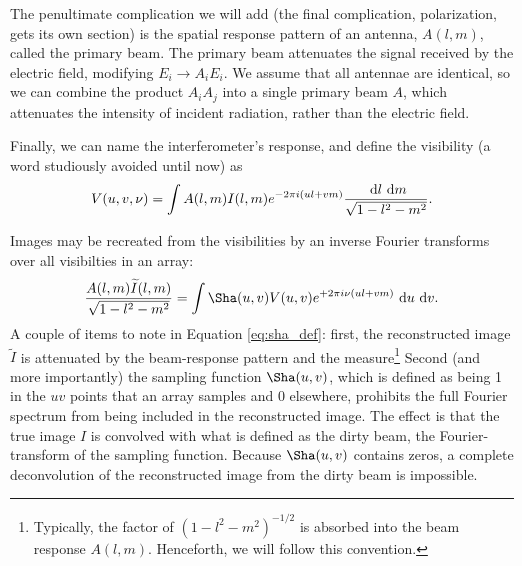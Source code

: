 The penultimate complication we will add (the final complication, polarization, gets its own
section) is the spatial response pattern of an antenna, $A(l,m)$, called the primary beam. The
primary beam attenuates the signal received by the electric field, modifying $E_i \to A_iE_i$.
We assume that all antennae are identical, so we can combine the product $A_iA_j$ into a single
primary beam $A$, which attenuates the intensity of incident radiation, rather than the electric
field.

Finally, we can name the interferometer's response, and define the visibility
(a word studiously
avoided until now) as
\begin{equation}
  V(u,v,\nu) = \int A(l,m)I(l,m)e^{-2\pi i (ul + vm)}\frac{\ \mathrm{d}l\ \mathrm{d}m}{\sqrt{1-l^2-m^2}}.
  \label{eq:visdef}
\end{equation}

Images may be recreated from the visibilities by an inverse Fourier transforms over all visibilties
in an array:
\begin{equation}
  \frac{A(l,m)\widetilde{I}(l,m)}{\sqrt{1-l^2-m^2}} 
  = \int \Sha(u,v)V(u,v)e^{+2\pi i\nu(ul+vm)}\D{u}\D{v}.
  \label{eq:sha_def}
\end{equation}
A couple of items to note in Equation \ref{eq:sha_def}: first, the reconstructed image
$\widetilde{I}$ is attenuated by the beam-response pattern and the measure\footnote{Typically, 
the factor of $(1-l^2-m^2)^{-1/2}$ is absorbed into the beam response $A(l,m)$. Henceforth, we will
follow this convention.} Second (and more importantly) the sampling function $\Sha(u,v)$, which is
defined as being 1 in the $uv$ points that an array samples and 0 elsewhere, prohibits the full
Fourier spectrum from being included in the reconstructed image. The effect is that the true image
$I$ is convolved with what is defined as the dirty beam, the Fourier-transform of the sampling
function. Because $\Sha(u,v)$ contains zeros, a complete deconvolution of the reconstructed image
from the dirty beam is impossible.


